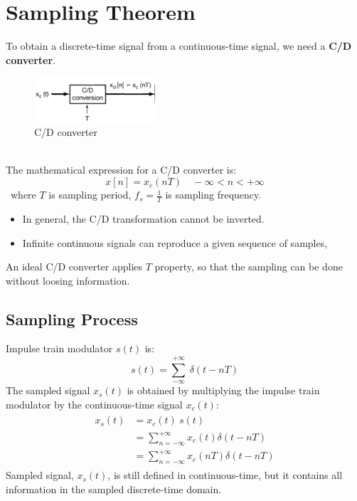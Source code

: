\section{Sampling Theorem}

To obtain a discrete-time signal from a continuous-time signal, we need a \textbf{C/D converter}.
 \begin{figure}[H]\centering
 \includegraphics[width = 0.4\textwidth]{images/cdconverter}
 \caption{C/D converter} \end{figure}
 \ \\
The mathematical expression for a C/D converter is:
\[ x[n] = x_{c}(nT) \quad -\infty < n < +\infty \]
\ where $T$ is sampling period, $f_{s} = \frac{1}{T}$ is sampling frequency. 
\begin{itemize}
\item In general, the C/D transformation cannot be inverted.
\item Infinite continuous signals can reproduce a given sequence of samples,
\end{itemize}
An ideal C/D converter applies $T$ property, so that the sampling can be done without loosing information. 

\subsection{Sampling Process}
Impulse train modulator $s(t)$ is: 
\[ s(t) = \sum_{-\infty}^{+\infty} \ \delta(t-nT) \]
The sampled signal $x_{s}(t)$ is obtained by multiplying the impulse train modulator by the continuous-time signal $x_{c}(t)$:
\begin{align*} 
\begin{split}
x_{s}(t) &= x_{c}(t) \ s(t)\\
&= \sum_{n=-\infty}^{+\infty} x_{c}(t) \delta(t-nT)\\
&= \sum_{n=-\infty}^{+\infty} x_{c}(nT) \delta(t-nT)
\end{split}
\end{align*}
Sampled signal, $x_{s}(t)$, is still defined in continuous-time, but it contains all information in the sampled discrete-time domain.\\\\

